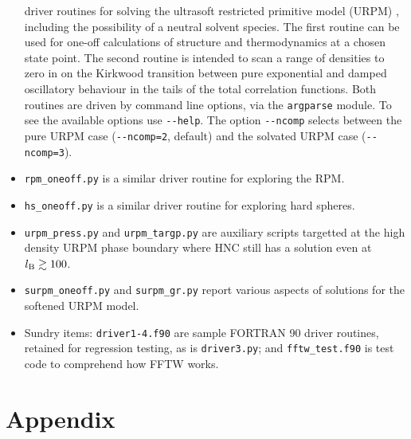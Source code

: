 \documentclass[12pt,a4paper]{article}
\begin{document}
\begin{itemize}
  driver routines for solving the ultrasoft restricted primitive model
  (URPM) \cite{WVA+13}, including the possibility of a neutral solvent
  species.  The first routine can be used for one-off calculations of
  structure and thermodynamics at a chosen state point.  The second
  routine is intended to scan a range of densities to zero in on the
  Kirkwood transition between pure exponential and damped oscillatory
  behaviour in the tails of the total correlation functions.  Both
  routines are driven by command line options, via the \verb+argparse+
  module.  To see the available options use \verb+--help+.  The option
  \verb+--ncomp+ selects between the pure URPM case (\verb+--ncomp=2+,
  default) and the solvated URPM case (\verb+--ncomp=3+).
%
\item\verb+rpm_oneoff.py+ is a similar driver routine for exploring
  the RPM.
%
\item\verb+hs_oneoff.py+ is a similar driver routine for exploring
  hard spheres.
%
\item\verb+urpm_press.py+ and \verb+urpm_targp.py+ are auxiliary
  scripts targetted at the high density URPM phase boundary where HNC
  still has a solution even at $l_{\mathrm{B}}\gtrsim100$.
%
\item\verb+surpm_oneoff.py+ and \verb+surpm_gr.py+ report various
  aspects of solutions for the softened URPM model. 
%
\item Sundry items: \verb+driver1-4.f90+ are sample FORTRAN 90 driver
  routines, retained for regression testing, as is \verb+driver3.py+;
  and \verb+fftw_test.f90+ is test code to comprehend how FFTW works.
%
\end{itemize}

\appendix
%
\section{Appendix}
%
\end{document}
